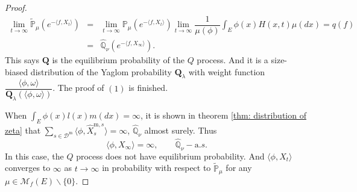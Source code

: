 \documentclass[12pt,a4paper]{amsart}
\numberwithin{equation}{section}
\theoremstyle{plain}
\theoremstyle{definition}
\theoremstyle{remark}
\begin{document}
\begin{proof}
\begin{eqnarray*}
\lim_{t\rightarrow\infty}\widetilde{\mathbb P}_\mu\left(e^{-\langle f, X_t\rangle}\right)&=&\lim_{t\rightarrow\infty}\mathbb P_\mu\left(e^{-\langle f, X_t\rangle}\right)
\lim_{t\to\infty}\dfrac{1}{\mu(\phi)}\int_E\phi(x)H(x, t)\mu(dx)=q(f)\\
&=&\widehat{\mathbb Q}_{\nu}\left(e^{-\langle f, X_{\infty}\rangle }\right).
\end{eqnarray*}
This says $\mathbf Q$ is the equilibrium probability of the $Q$ process.  And it is a size-biased distribution of the Yaglom probability $\mathbf Q_\lambda$ with weight function $\dfrac{\langle\phi,\omega\rangle}{\mathbf Q_\lambda(\langle\phi,\omega\rangle)}$.  The proof of $(1)$ is finished.


When $\int_E\hat\phi(x)l(x)m(dx)=\infty$, it is shown in theorem \ref{thm: distribution of zeta} that
 $\sum_{s\in\mathcal D^{\mathrm m}} \langle \phi,\widehat X^{{\mathrm m},s}_s\rangle =\infty$, $\widehat{\mathbb Q}_\nu$ almost surely. Thus
\[
\langle \phi, X_{\infty}\rangle =\infty,\qquad \widehat{\mathbb Q}_\nu-{\mathrm a.s.}
\]
In this case, the $Q$ process does not have equilibrium probability. And $\langle \phi, X_t\rangle $ converges to $\infty$ as $t\to\infty$ in probability with respect to $\widetilde{\mathbb P}_\mu$ for any $\mu\in \mathcal M_f(E)\backslash\{0\}$.
\end{proof}
\end{document}
